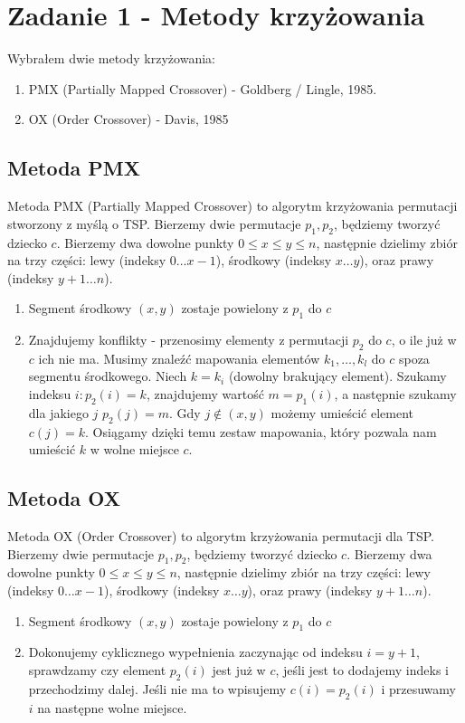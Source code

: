 \documentclass{article}
\begin{document}
\section{Zadanie 1 - Metody krzyżowania}

Wybrałem dwie metody krzyżowania:
\begin{enumerate}
    \item PMX (Partially Mapped Crossover) - Goldberg / Lingle, 1985. 
    \item OX (Order Crossover) - Davis, 1985
\end{enumerate}

\subsection{Metoda PMX}

Metoda PMX (Partially Mapped Crossover) to algorytm krzyżowania permutacji 
stworzony z myślą o TSP. Bierzemy dwie permutacje $p_1,p_2$, będziemy tworzyć dziecko $c$. Bierzemy dwa dowolne punkty $0\leq x\leq y \leq n$, następnie dzielimy zbiór na trzy części:
lewy (indeksy $0\dots x - 1$), środkowy (indeksy $x \dots y$), oraz prawy (indeksy $y+1 \dots n$). 
\begin{enumerate}
    \item Segment środkowy $(x,y)$ zostaje powielony z $p_1$ do $c$
    \item Znajdujemy konflikty - przenosimy elementy z permutacji $p_2$ do $c$, o ile już w $c$ ich nie ma.
    Musimy znaleźć mapowania elementów $k_1,\dots, k_l$ do $c$ spoza segmentu środkowego. Niech $k=k_i$ (dowolny brakujący element).
    Szukamy indeksu $i : p_2(i) = k$, znajdujemy wartość $m=p_1(i)$, a następnie szukamy dla jakiego $j$ $p_2(j)=m$.
    Gdy $j \notin (x,y)$ możemy umieścić element $c(j)=k$.
    Osiągamy dzięki temu zestaw mapowania, który pozwala nam umieścić $k$ w wolne miejsce $c$.
\end{enumerate}

\subsection{Metoda OX}

Metoda OX (Order Crossover) to algorytm krzyżowania permutacji dla TSP. Bierzemy dwie permutacje $p_1,p_2$, będziemy tworzyć dziecko $c$. Bierzemy dwa dowolne punkty $0\leq x\leq y \leq n$, następnie dzielimy zbiór na trzy części:
lewy (indeksy $0\dots x - 1$), środkowy (indeksy $x \dots y$), oraz prawy (indeksy $y+1 \dots n$). 
\begin{enumerate}
    \item Segment środkowy $(x,y)$ zostaje powielony z $p_1$ do $c$
    \item Dokonujemy cyklicznego wypełnienia zaczynając od indeksu $i=y+1$, sprawdzamy czy element $p_2(i)$ jest już w $c$,
    jeśli jest to dodajemy indeks i przechodzimy dalej. Jeśli nie ma to wpisujemy $c(i)=p_2(i)$ i przesuwamy $i$ na następne wolne miejsce.
\end{enumerate}
\end{document}
